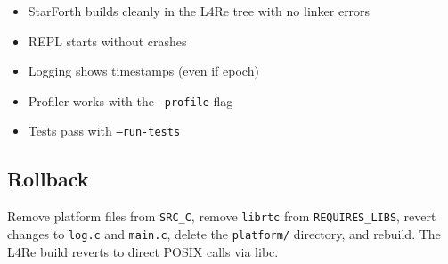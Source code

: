 \begin{itemize}
  \item StarForth builds cleanly in the L4Re tree with no linker errors
  \item REPL starts without crashes
  \item Logging shows timestamps (even if epoch)
  \item Profiler works with the \texttt{--profile} flag
  \item Tests pass with \texttt{--run-tests}
\end{itemize}

\subsection{Rollback}

Remove platform files from \texttt{SRC\_C}, remove \texttt{librtc} from
\texttt{REQUIRES\_LIBS}, revert changes to \texttt{log.c} and
\texttt{main.c}, delete the \texttt{platform/} directory, and rebuild.
The L4Re build reverts to direct POSIX calls via libc.
